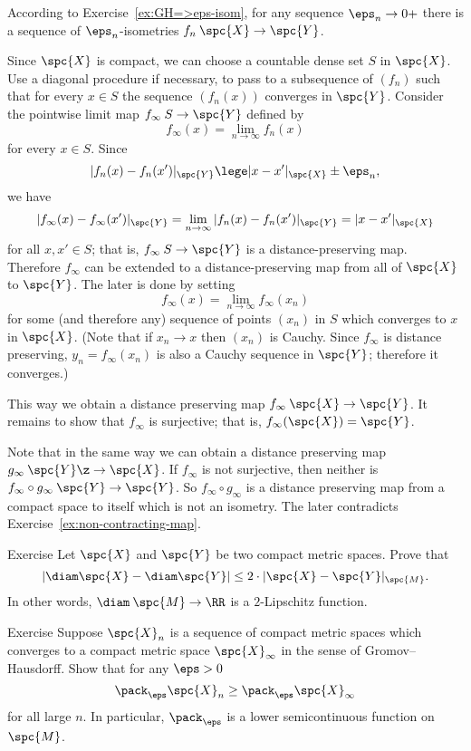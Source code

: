 According to Exercise~\ref{ex:GH=>eps-isom},
for any sequence $\eps_n\to0+$ there is a sequence of $\eps_n$-isometries 
$f_n\:\spc{X}\to \spc{Y}$.

Since $\spc{X}$ is compact, 
we can choose a countable dense set
$S$ in $\spc{X}$.
Use a diagonal procedure if necessary, to pass to a subsequence of $(f_n)$
such that for every $x \in S$ the sequence $(f_n(x))$ 
converges in $\spc{Y}$. 
Consider the pointwise limit map  $f_\infty \: S \to \spc{Y}$ defined by
 $$f_\infty(x) = \lim_{n\to\infty} f_n (x)$$ for every $x \in S$. 
Since $$|f_n (x)- f_n (x')|_{\spc{Y}}\lege |x- x'|_\spc{X} \pm\eps_n,$$ 
we have 
$$|f_\infty(x)-f_\infty (x')|_{\spc{Y}} 
= \lim_{n\to\infty} |f_n(x)-f_n (x')|_{\spc{Y}} 
= |x -x'|_\spc{X}$$ for all
$x, x' \in S$; 
that is, $f_\infty\:S\to \spc{Y}$ is a distance-preserving map. 
Therefore $f_\infty$ can be extended to a distance-preserving map from all of $\spc{X}$ to $\spc{Y}$.
The later is done by setting 
$$f_\infty(x)=\lim_{n\to\infty} f_\infty(x_n)$$ 
for some (and therefore any) sequence of points $(x_n)$ in $S$
which converges to $x$ in $\spc{X}$.
(Note that if $x_n\to x$ then $(x_n)$ is Cauchy.
Since $f_\infty$ is distance preserving, $y_n=f_\infty(x_n)$ is also a Cauchy sequence in $\spc{Y}$;
therefore it converges.)

This way we obtain a distance preserving map $f_\infty\:\spc{X}\to \spc{Y}$. 
It remains to show that $f_\infty$ is surjective; that is, $f_\infty(\spc{X})=\spc{Y}$.

Note that in the same way we can obtain a distance preserving map $g_\infty\:\spc{Y}\z\to \spc{X}$.
If $f_\infty$ is not surjective, then neither is $f_\infty\circ g_\infty\:\spc{Y}\to \spc{Y}$.
So $f_\infty \circ g_\infty$ is a distance preserving map from a compact space to itself which is not an isometry.
The later contradicts Exercise~\ref{ex:non-contracting-map}. 
\qeds

\begin{thm}{Exercise}\label{ex:d_GH-and-diam}
 Let $\spc{X}$ and $\spc{Y}$ be two compact metric spaces.
Prove that 
$$|\diam \spc{X} - \diam \spc{Y} |\le 2\cdot |\spc{X}-\spc{Y}|_{\spc{M}}.$$
In other words, $\diam\:\spc{M}\to\RR$ is a $2$-Lipschitz function.
\end{thm}

\begin{thm}{Exercise}\label{ex:pack-GH}
Suppose $\spc{X}_n$ is a sequence of compact metric spaces which converges to a compact metric space $\spc{X}_\infty$
in the sense of Gromov--Hausdorff.
Show that for any $\eps>0$
$$\pack_\eps \spc{X}_n\ge\pack_\eps \spc{X}_\infty$$ 
for all large $n$.
In particular, $\pack_\eps$ is a lower semicontinuous function on $\spc{M}$.
\end{thm}


